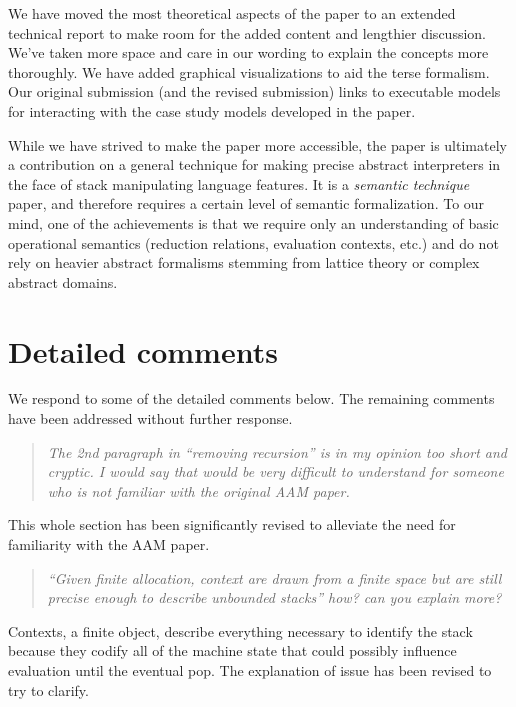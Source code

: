 \begin{titlepage}
We have moved the most theoretical aspects of the paper to an extended
technical report to make room for the added content and lengthier
discussion.  We've taken more space and care in our wording to explain
the concepts more thoroughly.  We have added graphical visualizations
to aid the terse formalism.  Our original submission (and the revised
submission) links to executable models for interacting with the case
study models developed in the paper.

While we have strived to make the paper more accessible, the paper is
ultimately a contribution on a general technique for making precise
abstract interpreters in the face of stack manipulating language
features.  It is a \emph{semantic technique} paper, and therefore
requires a certain level of semantic formalization.  To our mind, one
of the achievements is that we require only an understanding of basic
operational semantics (reduction relations, evaluation contexts, etc.)
and do not rely on heavier abstract formalisms stemming from lattice
theory or complex abstract domains.


\section*{Detailed comments}

We respond to some of the detailed comments below.  The remaining
comments have been addressed without further response.

\begin{quote}
\emph{
  The 2nd paragraph in ``removing recursion'' is in my opinion too short and cryptic. I would say that would be very difficult to understand for someone who is not familiar with the original AAM paper.}
\end{quote}

This whole section has been significantly revised to alleviate the
need for familiarity with the AAM paper.

\begin{quote}
\emph{``Given finite allocation, context are drawn from a finite space
  but are still precise enough to describe unbounded stacks'' how?
  can you explain more?}
\end{quote}

Contexts, a finite object, describe everything necessary to identify
the stack because they codify all of the machine state that could
possibly influence evaluation until the eventual pop.  The explanation
of issue has been revised to try to clarify.


\end{titlepage}
